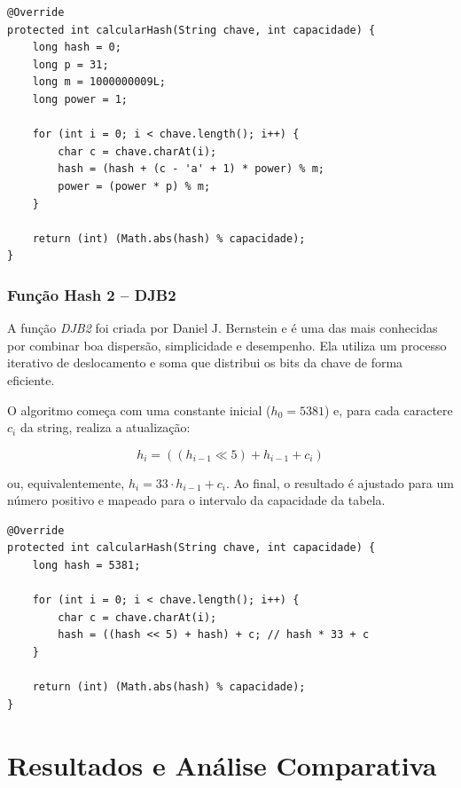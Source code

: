 \documentclass[12pt,a4paper]{abntex2}
\begin{document}
\begin{lstlisting}[style=console]
@Override
protected int calcularHash(String chave, int capacidade) {
    long hash = 0;
    long p = 31;
    long m = 1000000009L;
    long power = 1;

    for (int i = 0; i < chave.length(); i++) {
        char c = chave.charAt(i);
        hash = (hash + (c - 'a' + 1) * power) % m;
        power = (power * p) % m;
    }

    return (int) (Math.abs(hash) % capacidade);
}
\end{lstlisting}


\subsubsection{Função Hash 2 -- DJB2}
A função \textit{DJB2} foi criada por Daniel J. Bernstein e é uma das mais conhecidas por combinar boa dispersão, simplicidade e desempenho.
Ela utiliza um processo iterativo de deslocamento e soma que distribui os bits da chave de forma eficiente.

O algoritmo começa com uma constante inicial (\(h_0 = 5381\)) e, para cada caractere \(c_i\) da string, realiza a atualização:

\[
h_i = \left( (h_{i-1} \ll 5) + h_{i-1} + c_i \right)
\]

ou, equivalentemente, \( h_i = 33 \cdot h_{i-1} + c_i \).
Ao final, o resultado é ajustado para um número positivo e mapeado para o intervalo da capacidade da tabela.

\begin{lstlisting}[style=console]
@Override
protected int calcularHash(String chave, int capacidade) {
    long hash = 5381;

    for (int i = 0; i < chave.length(); i++) {
        char c = chave.charAt(i);
        hash = ((hash << 5) + hash) + c; // hash * 33 + c
    }

    return (int) (Math.abs(hash) % capacidade);
}
\end{lstlisting}




\newpage

\section{Resultados e Análise Comparativa}
\end{document}
